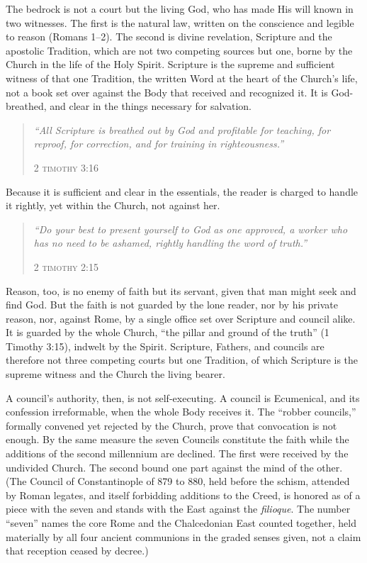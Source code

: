 \documentclass[11pt,twoside]{article}
\newenvironment{scripture}{\par\medskip\begin{quote}\color{subhead}}{\end{quote}\medskip}
\begin{document}
The bedrock is not a court but the living God, who has made His will known in two witnesses. The first is the natural law, written on the conscience and legible to reason (Romans 1–2). The second is divine revelation, Scripture and the apostolic Tradition, which are not two competing sources but one, borne by the Church in the life of the Holy Spirit. Scripture is the supreme and sufficient witness of that one Tradition, the written Word at the heart of the Church's life, not a book set over against the Body that received and recognized it. It is God-breathed, and clear in the things necessary for salvation.

\begin{scripture}\emph{``All Scripture is breathed out by God and profitable for teaching, for reproof, for correction, and for training in righteousness.''}\par\hfill\textsc{2 timothy 3:16}\end{scripture}

Because it is sufficient and clear in the essentials, the reader is charged to handle it rightly, yet within the Church, not against her.

\begin{scripture}\emph{``Do your best to present yourself to God as one approved, a worker who has no need to be ashamed, rightly handling the word of truth.''}\par\hfill\textsc{2 timothy 2:15}\end{scripture}

Reason, too, is no enemy of faith but its servant, given that man might seek and find God. But the faith is not guarded by the lone reader, nor by his private reason, nor, against Rome, by a single office set over Scripture and council alike. It is guarded by the whole Church, ``the pillar and ground of the truth'' (1 Timothy 3:15), indwelt by the Spirit. Scripture, Fathers, and councils are therefore not three competing courts but one Tradition, of which Scripture is the supreme witness and the Church the living bearer.

A council's authority, then, is not self-executing. A council is Ecumenical, and its confession irreformable, when the whole Body receives it. The ``robber councils,'' formally convened yet rejected by the Church, prove that convocation is not enough. By the same measure the seven Councils constitute the faith while the additions of the second millennium are declined. The first were received by the undivided Church. The second bound one part against the mind of the other. (The Council of Constantinople of 879 to 880, held before the schism, attended by Roman legates, and itself forbidding additions to the Creed, is honored as of a piece with the seven and stands with the East against the \emph{filioque}. The number ``seven'' names the core Rome and the Chalcedonian East counted together, held materially by all four ancient communions in the graded senses given, not a claim that reception ceased by decree.)
\end{document}
